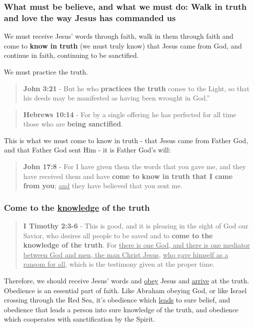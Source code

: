 \documentclass[11pt]{article}
\begin{document}
\subsubsection{What must be believe, and what we must do: Walk in \textbf{truth} and \textbf{love} the way Jesus has commanded us}
\label{sec:org62e4b23}

We must receive Jesus' words through faith, walk in them through faith and come to \textbf{know in truth} (we must truly know) that Jesus came from God, and continue in faith, continuing to be sanctified.

We must practice the truth.

\begin{quote}
\textbf{John 3:21} - But he who \textbf{practices the truth} comes to the Light, so that his deeds may be manifested as having been wrought in God.”
\end{quote}

\begin{quote}
\textbf{Hebrews 10:14} - For by a single offering he has perfected for all time those who are \textbf{being sanctified}.
\end{quote}

This is what we must come to know in truth - that Jesus came from Father God, and that Father God sent Him - it is Father God's will:

\begin{quote}
\textbf{John 17:8} - For I have given them the words that you gave me, and they have received them and have \textbf{come to know in truth that I came from you}; \uline{and} they have believed that you sent me.
\end{quote}

\subsubsection{Come to the \underline{knowledge} of the truth}
\label{sec:org8cdd6d0}

\begin{quote}
\textbf{I Timothy 2:3-6} - This is good, and it is pleasing in the sight of God our Savior, who desires all people to be saved and to \textbf{come to the knowledge of the truth}. For \uline{there is one God, and there is one mediator between God and men, the man Christ Jesus}, \uline{who gave himself as a ransom for all}, which is the testimony given at the proper time.
\end{quote}

Therefore, we should receive Jesus' words and \uline{obey} Jesus and \uline{arrive} at the truth. Obedience is an essential part of faith. Like Abraham obeying God, or like Israel crossing through the Red Sea, it's obedience which \uline{leads} to sure belief, and obedience that leads a person into sure knowledge of the truth, and obedience which cooperates with sanctification by the Spirit.
\end{document}
